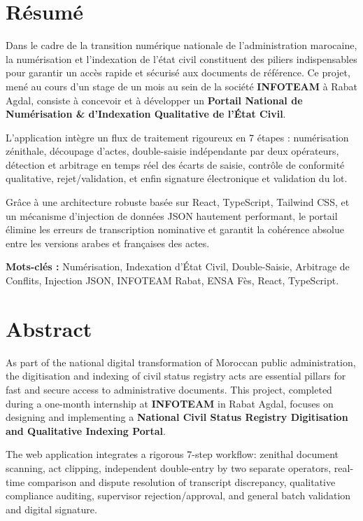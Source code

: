 \documentclass[12pt,a4paper,oneside]{report}
\begin{document}
\chapter*{Résumé}
Dans le cadre de la transition numérique nationale de l'administration marocaine, la numérisation et l'indexation de l'état civil constituent des piliers indispensables pour garantir un accès rapide et sécurisé aux documents de référence. Ce projet, mené au cours d'un stage de un mois au sein de la société \textbf{INFOTEAM} à Rabat Agdal, consiste à concevoir et à développer un \textbf{Portail National de Numérisation \& d'Indexation Qualitative de l'État Civil}.

L'application intègre un flux de traitement rigoureux en 7 étapes : numérisation zénithale, découpage d'actes, double-saisie indépendante par deux opérateurs, détection et arbitrage en temps réel des écarts de saisie, contrôle de conformité qualitative, rejet/validation, et enfin signature électronique et validation du lot. 

Grâce à une architecture robuste basée sur React, TypeScript, Tailwind CSS, et un mécanisme d'injection de données JSON hautement performant, le portail élimine les erreurs de transcription nominative et garantit la cohérence absolue entre les versions arabes et françaises des actes.

\textbf{Mots-clés :} Numérisation, Indexation d'État Civil, Double-Saisie, Arbitrage de Conflits, Injection JSON, INFOTEAM Rabat, ENSA Fès, React, TypeScript.

\newpage
\chapter*{Abstract}
As part of the national digital transformation of Moroccan public administration, the digitisation and indexing of civil status registry acts are essential pillars for fast and secure access to administrative documents. This project, completed during a one-month internship at \textbf{INFOTEAM} in Rabat Agdal, focuses on designing and implementing a \textbf{National Civil Status Registry Digitisation and Qualitative Indexing Portal}.

The web application integrates a rigorous 7-step workflow: zenithal document scanning, act clipping, independent double-entry by two separate operators, real-time comparison and dispute resolution of transcript discrepancy, qualitative compliance auditing, supervisor rejection/approval, and general batch validation and digital signature.
\end{document}
